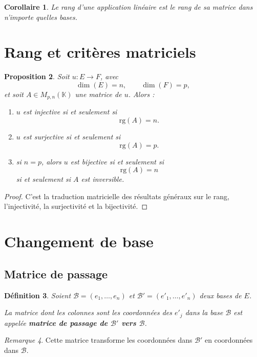 \documentclass[11pt,a4paper]{article}
\newtheorem{definition}{Définition}[section]
\newtheorem{proposition}[definition]{Proposition}
\newtheorem{corollaire}[definition]{Corollaire}
\theoremstyle{remark}
\newtheorem{remarque}[definition]{Remarque}
\newcommand{\K}{\mathbb{K}}
\newcommand{\rg}{\mathrm{rg}}
\begin{document}
\begin{corollaire}
Le rang d’une application linéaire est le rang de sa matrice dans n’importe quelles bases.
\end{corollaire}

\section{Rang et critères matriciels}

\begin{proposition}
Soit \(u:E\to F\), avec
\[
\dim(E)=n,\qquad \dim(F)=p,
\]
et soit \(A\in M_{p,n}(\K)\) une matrice de \(u\). Alors :
\begin{enumerate}[label=\arabic*)]
    \item \(u\) est injective si et seulement si
    \[
    \rg(A)=n.
    \]
    \item \(u\) est surjective si et seulement si
    \[
    \rg(A)=p.
    \]
    \item si \(n=p\), alors \(u\) est bijective si et seulement si
    \[
    \rg(A)=n
    \]
    si et seulement si \(A\) est inversible.
\end{enumerate}
\end{proposition}

\begin{proof}
C’est la traduction matricielle des résultats généraux sur le rang, l’injectivité, la surjectivité et la bijectivité.
\end{proof}

\section{Changement de base}

\subsection{Matrice de passage}

\begin{definition}
Soient \(\mathcal B=(e_1,\dots,e_n)\) et \(\mathcal B'=(e'_1,\dots,e'_n)\) deux bases de \(E\).

La matrice dont les colonnes sont les coordonnées des \(e'_j\) dans la base \(\mathcal B\) est appelée \textbf{matrice de passage de \(\mathcal B'\) vers \(\mathcal B\)}.
\end{definition}

\begin{remarque}
Cette matrice transforme les coordonnées dans \(\mathcal B'\) en coordonnées dans \(\mathcal B\).
\end{remarque}
\end{document}
